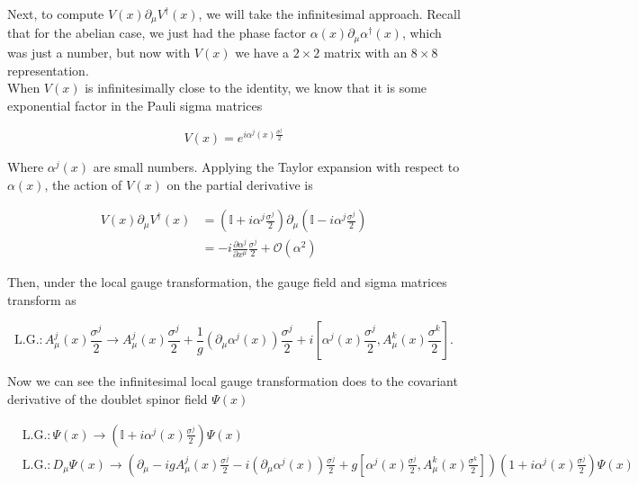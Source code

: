 \noindent Next, to compute $V(x) \partial_\mu V^\dagger (x)$, we will take the infinitesimal approach. Recall that for the abelian case, we just had the phase factor $\alpha(x) \partial_\mu \alpha^\dagger (x)$, which was just a number, but now with $V(x)$ we have a $2 \times 2$ matrix with an $8 \times 8$ representation. \\

\noindent When $V(x)$ is infinitesimally close to the identity, we know that it is some exponential factor in the Pauli sigma matrices

\begin{equation}
V(x) = e^{i \alpha^j (x) \frac{\sigma^j}{2}}
\end{equation}

\noindent Where $\alpha^j (x)$ are small numbers. Applying the Taylor expansion with respect to $\alpha(x)$, the action of $V(x)$ on the partial derivative is

\begin{align}
V(x) \partial_\mu V^\dagger (x) &= (\mathbb{I} + i \alpha^j \frac{\sigma^j}{2}) \partial_\mu (\mathbb{I} - i \alpha^j \frac{\sigma^j}{2}) \\
&= -i \frac{\partial \alpha^j}{\partial x^\mu} \frac{\sigma^j}{2} + \mathcal{O}(\alpha^2)
\end{align}

\noindent Then, under the local gauge transformation, the gauge field and sigma matrices transform as

\begin{equation}
\text{L.G.}: A_\mu^j (x) \frac{\sigma^j}{2} \rightarrow A_\mu^j (x) \frac{\sigma^j}{2} + \frac{1}{g} (\partial_\mu \alpha^j (x)) \frac{\sigma^j}{2} + i \left[ \alpha^j (x) \frac{\sigma^j}{2}, A_\mu^k (x) \frac{\sigma^k}{2} \right].
\end{equation}

\noindent Now we can see the infinitesimal local gauge transformation does to the covariant derivative of the doublet spinor field $\Psi (x)$

\begin{align}
&\text{L.G.}: \Psi (x) \rightarrow \left( \mathbb{I} + i \alpha^j (x) \frac{\sigma^j}{2} \right) \Psi (x) \\
&\text{L.G.}: D_\mu \Psi (x) \rightarrow \left( \partial_\mu - i g A_\mu^j (x) \frac{\sigma^j}{2} - i (\partial_\mu \alpha^j (x)) \frac{\sigma^j}{2} + g \left[ \alpha^j (x) \frac{\sigma^j}{2}, A_\mu^k (x) \frac{\sigma^k}{2} \right] \right) \left(1 + i \alpha^j (x) \frac{\sigma^j}{2} \right) \Psi (x)
\end{align}

